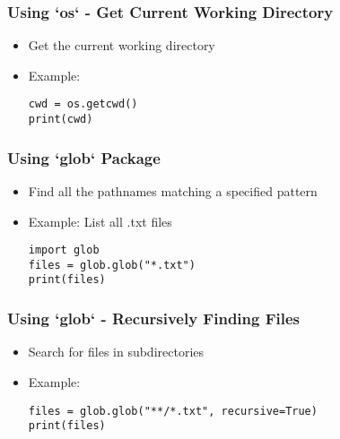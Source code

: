 \documentclass{beamer}
\begin{document}
\begin{frame}
    \frametitle{Using `os` - Get Current Working Directory}
    \begin{itemize}
        \item Get the current working directory
        \item Example:
        \begin{tcolorbox}[colback=lightblue, colframe=darkblue, title=Current Directory]
            \lstinline|cwd = os.getcwd()| \\
            \lstinline|print(cwd)|
        \end{tcolorbox}
    \end{itemize}
\end{frame}

\begin{frame}
    \frametitle{Using `glob` Package}
    \begin{itemize}
        \item Find all the pathnames matching a specified pattern
        \item Example: List all .txt files
        \begin{tcolorbox}[colback=lightblue, colframe=darkblue, title=Glob Example]
            \lstinline|import glob| \\
            \lstinline|files = glob.glob("*.txt")| \\
            \lstinline|print(files)|
        \end{tcolorbox}
    \end{itemize}
\end{frame}

\begin{frame}
    \frametitle{Using `glob` - Recursively Finding Files}
    \begin{itemize}
        \item Search for files in subdirectories
        \item Example:
        \begin{tcolorbox}[colback=lightblue, colframe=darkblue, title=Recursive Search]
            \lstinline|files = glob.glob("**/*.txt", recursive=True)| \\
            \lstinline|print(files)|
        \end{tcolorbox}
    \end{itemize}
\end{frame}
\end{document}
